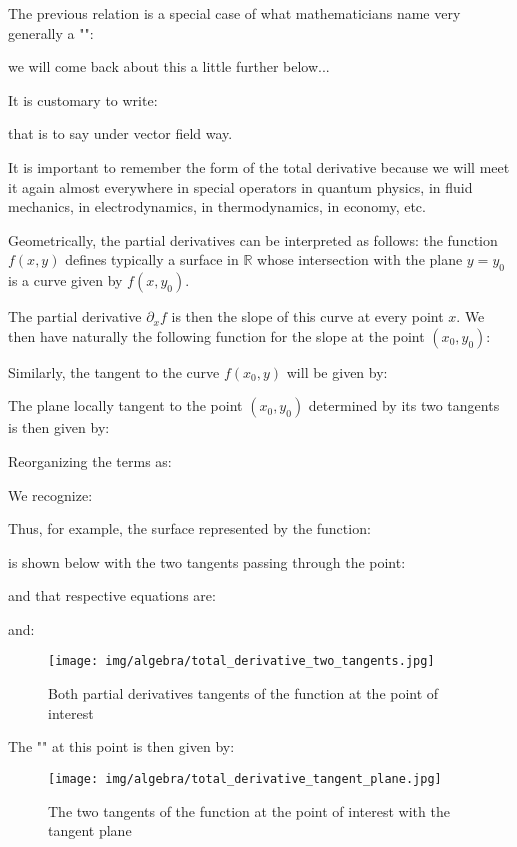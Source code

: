 	The previous relation is a special case of what mathematicians name very generally a "":
	
	we will come back about this a little further below... 
	
	It is customary to write:
	
	that is to say under vector field way.
	
	It is important to remember the form of the total derivative because we will meet it again almost everywhere in special operators in quantum physics, in fluid mechanics, in electrodynamics, in thermodynamics, in economy, etc.
	
	Geometrically, the partial derivatives can be interpreted as follows: the function $f(x, y)$ defines typically a surface in $\mathbb{R}$ whose intersection with the plane $y=y_0$ is a curve given by $f(x,y_0)$.
	
	The partial derivative $\partial_x f$ is then the slope of this curve at every point $x$. We then have naturally the following function for the slope at the point $(x_0,y_0)$:
	
	Similarly, the tangent to the curve $f(x_0,y)$ will be given by:
	
	The plane locally tangent to the point $(x_0,y_0)$ determined by its two tangents is then given by:
	
	Reorganizing the terms as:
	
	We recognize:
	
	Thus, for example, the surface represented by the function:
	
	is shown below with the two tangents passing through the point:
	
	and that respective equations are:
	
	and:
	
	\begin{figure}[H]
		\centering
		\texttt{[image: img/algebra/total\_derivative\_two\_tangents.jpg]}
		\caption[]{Both partial derivatives tangents of the function at the point of interest}
	\end{figure}
	The "" at this point is then given by:
		
	\begin{figure}[H]
		\centering
		\texttt{[image: img/algebra/total\_derivative\_tangent\_plane.jpg]}
		\caption[]{The two tangents of the function at the point of interest with the tangent plane}
	\end{figure}
	
